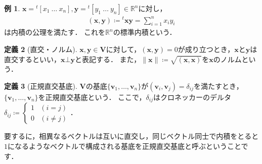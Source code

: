\documentclass[dvipdfmx]{jsarticle}
\theoremstyle{definition}
\newtheorem{definition}{定義}[section]
\newtheorem{example}[definition]{例}
\newcommand{\tp}[1]{{}^{t}#1}
\begin{document}
\begin{example}
    \label{ip_ex_ei}
    $\bm{x} = \tp{[x_1 \ \ldots \ x_n]}, \bm{y} = \tp{[y_1 \ \ldots \ y_n]} \in \mathbb{R}^n$に対し，
    \begin{align*}
        (\bm{x}, \bm{y}) \coloneqq \tp{\bm{x}} \bm{y} = \sum_{i=1}^{n} x_i y_i
    \end{align*}
    は内積の公理を満たす．
    これを$\mathbb{R}^n$の標準内積という．
\end{example}
\begin{definition}[直交・ノルム]
    $\bm{x}, \bm{y} \in \bm{V}$に対して，$(\bm{x}, \bm{y}) = 0$が成り立つとき，$\bm{x}$と$\bm{y}$は直交するといい，$\bm{x} \bot \bm{y}$と表記する．
    また，$\displaystyle \| \bm{x} \| \coloneqq \sqrt{(\bm{x}, \bm{x})}$を$\bm{x}$のノルムという．
\end{definition}
\begin{definition}[正規直交基底]
    $\bm{V}$の基底$\{ \bm{v}_1, \ldots, \bm{v}_n \}$が$(\bm{v}_i, \bm{v}_j) = \delta_{ij}$を満たすとき，
    $\{ \bm{v}_1, \ldots, \bm{v}_n \}$を正規直交基底という．
    ここで，$\delta_{ij}$はクロネッカーのデルタ$\displaystyle \delta_{ij} \coloneqq \begin{cases} 1 & (i = j) \\ 0 & (i \neq j) \end{cases}$．
\end{definition}
要するに，相異なるベクトルは互いに直交し，同じベクトル同士で内積をとると$1$になるようなベクトルで構成される基底を正規直交基底と呼ぶということです．


\end{document}

